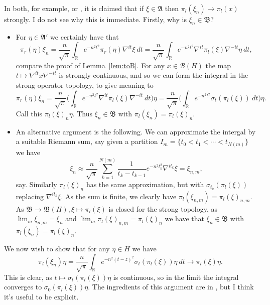 \documentclass[a4paper,11pt]{article}
\theoremstyle{plain}
\theoremstyle{remark}
\newcommand{\mc}[1]{\mathcal{#1}}
\newcommand{\mf}[1]{\mathfrak{#1}}
\begin{document}
In both, for example, \cite[Proof of Theorem~VI.2.2]{TakesakiII} or \cite[Page~303]{StratilaZsido}, it is claimed that if $\xi\in\mf A$ then $\pi_l(\xi_n) \to \pi_l(x)$ strongly.  I do not see why this is immediate.  Firstly, why is $\xi_n\in\mf B$?
\begin{itemize}
\item For $\eta\in\mf A'$ we certainly have that
\[ \pi_r(\eta) \xi_n = \frac{n}{\sqrt\pi} \int_{\mathbb R} e^{-n^2t^2} \pi_r(\eta) \nabla^{it}\xi \ dt 
= \frac{n}{\sqrt\pi} \int_{\mathbb R} e^{-n^2t^2} \nabla^{it}\pi_l(\xi) \nabla^{-it}\eta \ dt, \]
compare the proof of Lemma~\ref{lem:toB}.  For any $x\in\mc B(H)$ the map $t\mapsto \nabla^{it} x \nabla^{-it}$ is strongly continuous, and so we can form the integral in the strong operator topology, to give meaning to
\[ \pi_r(\eta) \xi_n
= \frac{n}{\sqrt\pi} \Big( \int_{\mathbb R} e^{-n^2t^2} \nabla^{it}\pi_l(\xi) \nabla^{-it} \ dt \Big) \eta
= \frac{n}{\sqrt\pi} \Big( \int_{\mathbb R} e^{-n^2t^2} \sigma_t(\pi_l(\xi)) \ dt \Big) \eta. \]
Call this $\pi_l(\xi)_n \eta$.  Thus $\xi_n\in\mf B$ with $\pi_l(\xi_n) = \pi_l(\xi)_n$.

\item An alternative argument is the following.  We can approximate the intergal by a suitable Riemann sum, say given a partition $I_m = \{ t_0 < t_1 < \cdots < t_{N(m)} \}$ we have
\[ \xi_n \approx \frac{n}{\sqrt\pi} \sum_{k=1}^{N(m)} \frac{1}{t_k-t_{k-1}} e^
{-n^2t_k^2} \nabla^{it_k} \xi = \xi_{n,m}, \]
say.  Similarly $\pi_l(\xi)_n$ has the same approximation, but with $\sigma_{t_k}(\pi_l(\xi))$ replacing $\nabla^{it_k}\xi$.  As the sum is finite, we clearly have $\pi_l(\xi_{n,m}) = \pi_l(\xi)_{n,m}$.  As $\mf B \to \mf B(H), \xi\mapsto\pi_l(\xi)$ is closed for the strong topology, as $\lim_m \xi_{n,m} = \xi_n$ and $\lim_m \pi_l(\xi)_{n,m} = \pi_l(\xi)_n$ we have that $\xi_n\in\mf B$ with $\pi_l(\xi_n) = \pi_l(\xi)_n$.
\end{itemize}
We now wish to show that for any $\eta\in H$ we have
\[ \pi_l(\xi_n)\eta = \frac{n}{\sqrt\pi} \int_{\mathbb R} e^{-n^2(t-z)^2} \sigma_t(\pi_l(\xi))\eta \ dt \to \pi_l(\xi)\eta. \]
This is clear, as $t\mapsto \sigma_t(\pi_l(\xi))\eta$ is continuous, so in the limit the integral converges to $\sigma_0(\pi_l(\xi))\eta$.  The ingredients of this argument are in \cite[Proof of Theorem~VI.2.2]{TakesakiII}, but I think it's useful to be explicit.



\end{document}
